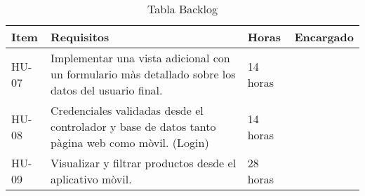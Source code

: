 \begin{table}[htbp]
	\begin{center}
		\begin{tabular}{|p{2.5cm}|p{6.5cm}|p{2.5cm}|p{2.5cm}|}
			\hline
			Item & Requisitos & Horas & Encargado\\
			\hline \hline
			HU-07 & 
			 Implementar una vista adicional con un  formulario màs detallado  sobre los datos del usuario final.
			 & 14 horas & \\ \hline
			 
			 
			 
			HU-08 & Credenciales validadas desde el controlador y base de datos tanto pàgina web como mòvil. (Login)
			  & 14 horas & \\ \hline
			  
			  	HU-09 & Visualizar y filtrar productos desde
			  	el aplicativo mòvil.
			  	
			  & 28 horas & \\ \hline
			
		\end{tabular}
		\caption{Tabla Backlog}
		\label{tabla:sencilla}
	\end{center}
\end{table}